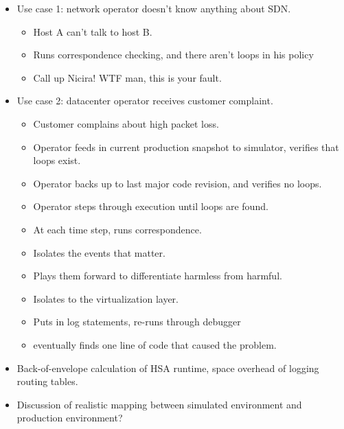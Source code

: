 \begin{itemize}
\item Use case 1: network operator doesn't know anything about SDN.
    \begin{itemize}
    \item Host A can't talk to host B.
    \item Runs correspondence checking, and there aren't loops in his policy
    \item Call up Nicira! WTF man, this is your fault.
    \end{itemize}
\item Use case 2: datacenter operator receives customer complaint.
    \begin{itemize}
    \item Customer complains about high packet loss.
    \item Operator feeds in current production snapshot to simulator, verifies that loops
    exist.
    \item Operator backs up to last major code revision, and verifies no
    loops.
    \item Operator steps through execution until loops are found.
    \item At each time step, runs correspondence.
    \item Isolates the events that matter.
    \item Plays them forward to differentiate harmless from harmful.
    \item Isolates to the virtualization layer.
    \item Puts in log statements, re-runs through debugger
    \item eventually finds one line of code that caused the problem.
    \end{itemize}
\item {} Back-of-envelope calculation of HSA runtime,
space overhead of logging routing tables.
\item Discussion of realistic mapping between simulated environment and
production environment?
\end{itemize}
